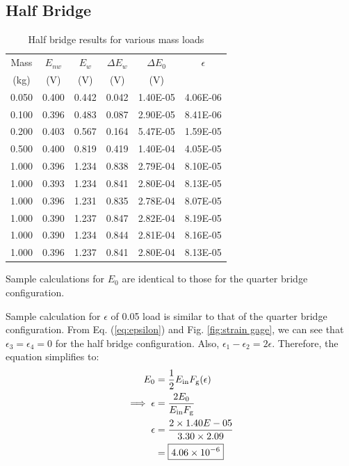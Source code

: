 \subsection{Half Bridge}
\begin{table}
    \centering
    \caption{Half bridge results for various mass loads}
    \label{tab:Q1HalfBridge}
    \begin{tabular}{cccccc}
        \toprule
        Mass & $E_{nw}$ & $E_w$ & $\Delta E_w$ & $\Delta E_0$ & $\epsilon$ \\
        (kg) & (V) & (V) & (V) & (V) & \\
        \midrule
        0.050 & 0.400 & 0.442 & 0.042 & 1.40E-05 & 4.06E-06 \\
        0.100 & 0.396 & 0.483 & 0.087 & 2.90E-05 & 8.41E-06 \\
        0.200 & 0.403 & 0.567 & 0.164 & 5.47E-05 & 1.59E-05 \\
        0.500 & 0.400 & 0.819 & 0.419 & 1.40E-04 & 4.05E-05 \\
        1.000 & 0.396 & 1.234 & 0.838 & 2.79E-04 & 8.10E-05 \\
        1.000 & 0.393 & 1.234 & 0.841 & 2.80E-04 & 8.13E-05 \\
        1.000 & 0.396 & 1.231 & 0.835 & 2.78E-04 & 8.07E-05 \\
        1.000 & 0.390 & 1.237 & 0.847 & 2.82E-04 & 8.19E-05 \\
        1.000 & 0.390 & 1.234 & 0.844 & 2.81E-04 & 8.16E-05 \\
        1.000 & 0.396 & 1.237 & 0.841 & 2.80E-04 & 8.13E-05 \\
        \bottomrule
    \end{tabular}
\end{table}

Sample calculations for $E_0$ are identical to those for the quarter bridge configuration. 

Sample calculation for $\epsilon$ of 0.05 load is similar to that of the quarter bridge configuration. From Eq. (\ref{eq:epsilon}) and 
Fig. \ref{fig:strain gage}, we can see that $\epsilon_3 = \epsilon_4 = 0$ for the half bridge configuration. Also,
$\epsilon_1 - \epsilon_2 = 2 \epsilon$. Therefore, the equation simplifies to:
\begin{align*}
    E_0 &= \frac{1}{2} E_{\text{in}} F_{\text{g}}
    (\epsilon) \\
    \implies \epsilon &= \frac{2 E_0}{E_{\text{in}} F_{\text{g}}} \\
    \epsilon &= \frac{2 \times 1.40E-05}{3.30 \times 2.09} \\
     &= \boxed{\qty{4.06E-06}{}}
\end{align*}

